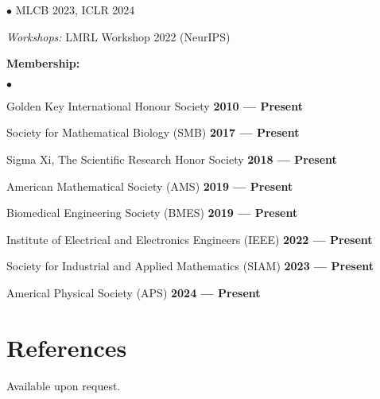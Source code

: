 \documentclass[margin,line]{res}
\newenvironment{list1}{
  \begin{list}{\ding{113}}{
      \setlength{\itemsep}{0in}
      \setlength{\parsep}{0in} \setlength{\parskip}{0in}
      \setlength{\topsep}{0in} \setlength{\partopsep}{0in}
      \setlength{\leftmargin}{0.17in}}}{\end{list}}
\newenvironment{list2}{
  \begin{list}{$\bullet$}{
      \setlength{\itemsep}{0in}
      \setlength{\parsep}{0in} \setlength{\parskip}{0in}
      \setlength{\topsep}{0in} \setlength{\partopsep}{0in}
      \setlength{\leftmargin}{0.2in}}}{\end{list}}
\begin{document}
\begin{resume}
\begin{list1}
\begin{list2}
  \hspace*{6.2em} MLCB 2023, ICLR 2024
  \item[] \textit{Workshops:} \hspace*{0.6em} LMRL Workshop 2022 (NeurIPS)
  \end{list2}
\vspace*{.2cm}
\item[] {\bf Membership:}
\vspace*{.2cm}
  \begin{list2}
  \setlength\itemsep{0.5em}
  \item[] Golden Key International Honour Society \hfill {\bf \small 2010 --- Present}
  \item[] Society for Mathematical Biology (SMB) \hfill {\bf \small 2017 --- Present}
  \item[] Sigma Xi, The Scientific Research Honor Society \hfill {\bf \small 2018 --- Present}
  \item[] American Mathematical Society (AMS) \hfill {\bf \small 2019 --- Present}
  \item[] Biomedical Engineering Society (BMES) \hfill {\bf \small 2019 --- Present}
  \item[] Institute of Electrical and Electronics Engineers (IEEE) \hfill {\bf \small 2022 --- Present}
  \item[] Society for Industrial and Applied Mathematics (SIAM) \hfill {\bf \small 2023 --- Present} 
  \item[] Americal Physical Society (APS) \hfill {\bf \small 2024 --- Present}  
  \end{list2}
\end{list1}

\vspace*{.2cm}

\section{\sc References} Available upon request.




\end{resume}
\end{document}
